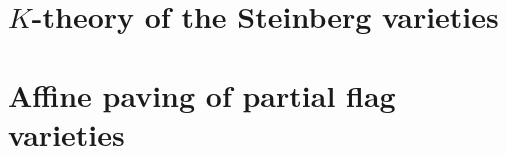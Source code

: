 \documentclass[reqno,11pt,openany]{book}
\numberwithin{equation}{section}
\theoremstyle{plain}
\theoremstyle{plain}
\numberwithin{equation}{section}
\theoremstyle{remark}
\theoremstyle{theoremletter}
\begin{document}
\setcounter{tocdepth}{1}



\part{{$K$-theory of the Steinberg varieties}}\label{part:Steinberg_varieties}







\part{Affine paving of partial flag varieties}\label{part:partial_flag_varieties}




\end{document}
